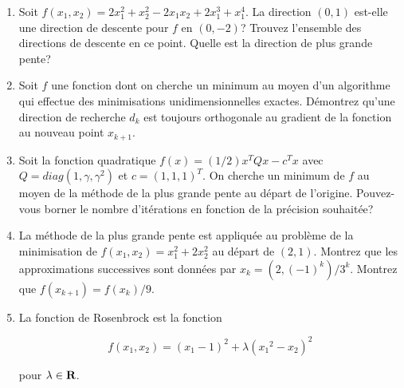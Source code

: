 \begin{enumerate}
    \begin{solution}
    \end{solution}

  \item Soit $f(x_1, x_2)=2x_1^2 + x_2^2 -2 x_1 x_2 + 2 x_1^3 + x_1^4$. La direction $(0, 1)$ est-elle une direction de descente pour $f$ en
    $(0, -2)$? Trouvez l'ensemble des directions de descente en ce point. Quelle est la direction de plus grande pente?

    \begin{solution}
    \end{solution}

  \item Soit $f$ une fonction dont on cherche un minimum au moyen d'un algorithme qui effectue des minimisations unidimensionnelles exactes.
    Démontrez qu'une direction de recherche $d_k$ est toujours orthogonale au gradient de la fonction au nouveau point $x_{k+1}$.

    \begin{solution}
    \end{solution}

  \item Soit la fonction quadratique $f(x)=(1/2) x^T Q x-c^T x$ avec $Q=diag(1, \gamma, \gamma^2)$ et $c=(1, 1, 1)^T$. On cherche un minimum
    de $f$ au moyen de la méthode de la plus grande pente au départ de l'origine. Pouvez-vous borner le nombre d'itérations en fonction de la
    précision souhaitée?

    \begin{solution}
    \end{solution}

  \item La méthode de la plus grande pente est appliquée au problème de la minimisation de $f(x_1, x_2)=x_1^2 + 2 x_2^2$ au départ de $(2, 1)$.
    Montrez que les approximations successives sont données par $x_k =  (2, (-1)^k)/3^k$. Montrez que $f(x_{k+1})=f(x_k)/9$.


    \begin{solution}
    \end{solution}

  \item  La fonction de Rosenbrock est la fonction

    $$f(x_1,x_2) = (x_1-1)^2 + \lambda({x_1}^2-x_2)^2$$

    pour $\lambda \in {\mbox{\bf R}}$.\\




\end{enumerate}
